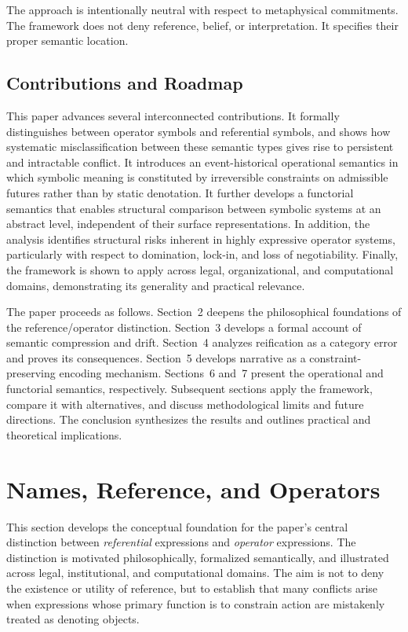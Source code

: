\documentclass[11pt]{article}
\begin{document}
The approach is intentionally neutral with respect to metaphysical commitments.
The framework does not deny reference, belief, or interpretation. It specifies
their proper semantic location.

\subsection{Contributions and Roadmap}

This paper advances several interconnected contributions. It formally
distinguishes between operator symbols and referential symbols, and shows how
systematic misclassification between these semantic types gives rise to
persistent and intractable conflict. It introduces an event-historical
operational semantics in which symbolic meaning is constituted by irreversible
constraints on admissible futures rather than by static denotation. It further
develops a functorial semantics that enables structural comparison between
symbolic systems at an abstract level, independent of their surface
representations. In addition, the analysis identifies structural risks inherent
in highly expressive operator systems, particularly with respect to domination,
lock-in, and loss of negotiability. Finally, the framework is shown to apply
across legal, organizational, and computational domains, demonstrating its
generality and practical relevance.

The paper proceeds as follows. Section~2 deepens the philosophical foundations of
the reference/operator distinction. Section~3 develops a formal account of
semantic compression and drift. Section~4 analyzes reification as a category
error and proves its consequences. Section~5 develops narrative as a constraint-
preserving encoding mechanism. Sections~6 and~7 present the operational and
functorial semantics, respectively. Subsequent sections apply the framework,
compare it with alternatives, and discuss methodological limits and future
directions. The conclusion synthesizes the results and outlines practical and
theoretical implications.

\section{Names, Reference, and Operators}

This section develops the conceptual foundation for the paper’s central
distinction between \emph{referential} expressions and \emph{operator} expressions.
The distinction is motivated philosophically, formalized semantically, and
illustrated across legal, institutional, and computational domains. The aim is
not to deny the existence or utility of reference, but to establish that many
conflicts arise when expressions whose primary function is to constrain action
are mistakenly treated as denoting objects.
\end{document}

